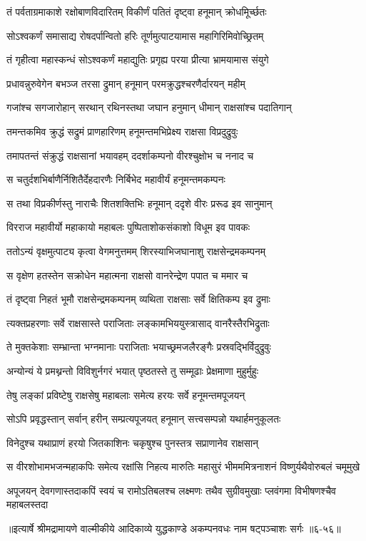 \twolineshloka
{तं पर्वताग्रमाकाशे रक्षोबाणविदारितम्}
{विकीर्णं पतितं दृष्ट्वा हनूमान् क्रोधमूिर्च्छतः} %

\twolineshloka
{सोऽश्वकर्णं समासाद्य रोषदर्पान्वितो हरिः}
{तूर्णमुत्पाटयामास महागिरिमिवोच्छ्रितम्} %

\twolineshloka
{तं गृहीत्वा महास्कन्धं सोऽश्वकर्णं महाद्युतिः}
{प्रगृह्य परया प्रीत्या भ्रामयामास संयुगे} %

\twolineshloka
{प्रधावन्नुरुवेगेन बभञ्ज तरसा द्रुमान्}
{हनूमान् परमक्रुद्धश्चरणैर्दारयन् महीम्} %

\twolineshloka
{गजांश्च सगजारोहान् सरथान् रथिनस्तथा}
{जघान हनुमान् धीमान् राक्षसांश्च पदातिगान्} %

\twolineshloka
{तमन्तकमिव क्रुद्धं सद्रुमं प्राणहारिणम्}
{हनूमन्तमभिप्रेक्ष्य राक्षसा विप्रदुद्रुवुः} %

\twolineshloka
{तमापतन्तं संक्रुद्धं राक्षसानां भयावहम्}
{ददर्शाकम्पनो वीरश्चुक्षोभ च ननाद च} %

\twolineshloka
{स चतुर्दशभिर्बाणैर्निशितैर्देहदारणैः}
{निर्बिभेद महावीर्यं हनूमन्तमकम्पनः} %

\twolineshloka
{स तथा विप्रकीर्णस्तु नाराचैः शितशक्तिभिः}
{हनूमान् ददृशे वीरः प्ररूढ इव सानुमान्} %

\twolineshloka
{विरराज महावीर्यो महाकायो महाबलः}
{पुष्पिताशोकसंकाशो विधूम इव पावकः} %

\twolineshloka
{ततोऽन्यं वृक्षमुत्पाट्य कृत्वा वेगमनुत्तमम्}
{शिरस्याभिजघानाशु राक्षसेन्द्रमकम्पनम्} %

\twolineshloka
{स वृक्षेण हतस्तेन सक्रोधेन महात्मना}
{राक्षसो वानरेन्द्रेण पपात च ममार च} %

\twolineshloka
{तं दृष्ट्वा निहतं भूमौ राक्षसेन्द्रमकम्पनम्}
{व्यथिता राक्षसाः सर्वे क्षितिकम्प इव द्रुमाः} %

\twolineshloka
{त्यक्तप्रहरणाः सर्वे राक्षसास्ते पराजिताः}
{लङ्कामभिययुस्त्रासाद् वानरैस्तैरभिद्रुताः} %

\twolineshloka
{ते मुक्तकेशाः सम्भ्रान्ता भग्नमानाः पराजिताः}
{भयाच्छ्रमजलैरङ्गैः प्रस्रवद्भिर्विदुद्रुवुः} %

\twolineshloka
{अन्योन्यं ये प्रमथ्नन्तो विविशुर्नगरं भयात्}
{पृष्ठतस्ते तु सम्मूढाः प्रेक्षमाणा मुहुर्मुहुः} %

\twolineshloka
{तेषु लङ्कां प्रविष्टेषु राक्षसेषु महाबलाः}
{समेत्य हरयः सर्वे हनूमन्तमपूजयन्} %

\twolineshloka
{सोऽपि प्रवृद्धस्तान् सर्वान् हरीन् सम्प्रत्यपूजयत्}
{हनूमान् सत्त्वसम्पन्नो यथार्हमनुकूलतः} %

\twolineshloka
{विनेदुश्च यथाप्राणं हरयो जितकाशिनः}
{चकृषुश्च पुनस्तत्र सप्राणानेव राक्षसान्} %

\twolineshloka
{स वीरशोभामभजन्महाकपिः समेत्य रक्षांसि निहत्य मारुतिः}
{महासुरं भीमममित्रनाशनं विष्णुर्यथैवोरुबलं चमूमुखे} %

\twolineshloka
{अपूजयन् देवगणास्तदाकपिं स्वयं च रामोऽतिबलश्च लक्ष्मणः}
{तथैव सुग्रीवमुखाः प्लवंगमा विभीषणश्चैव महाबलस्तदा} %


॥इत्यार्षे श्रीमद्रामायणे वाल्मीकीये आदिकाव्ये युद्धकाण्डे अकम्पनवधः नाम षट्पञ्चाशः सर्गः ॥६-५६॥
